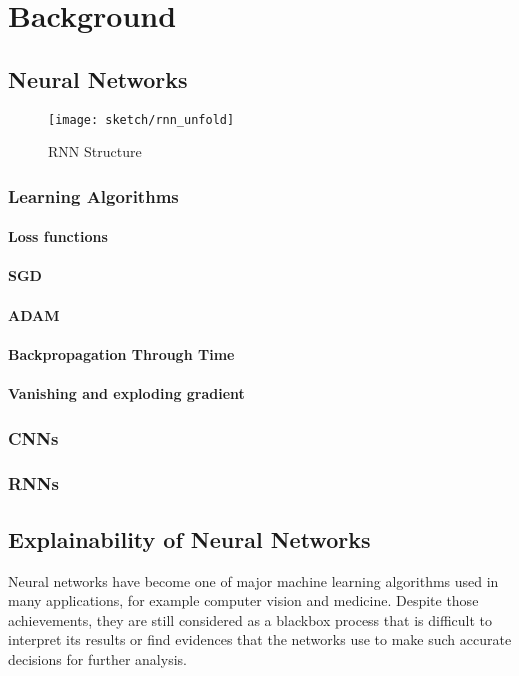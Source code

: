 \chapter{Background\label{cha:chapter3}}

\section{Neural Networks}
\begin{figure}[h]
\centering
\texttt{[image: sketch/rnn\_unfold]}
\caption{RNN Structure}
\label{fig:rnn_unfold}
\end{figure}

\subsection{Learning Algorithms}
\subsubsection{Loss functions}
\subsubsection{SGD}
\subsubsection{ADAM}
\subsubsection{Backpropagation Through Time}
\subsubsection{Vanishing and exploding gradient}

\subsection{CNNs}
\subsection{RNNs}

\section{Explainability of Neural Networks}
Neural networks have become one of major machine learning algorithms used in many applications, for example computer vision and medicine. Despite those achievements, they are still considered as a blackbox process that is  difficult to interpret its results or find evidences that the networks use to make such accurate decisions for further analysis.


